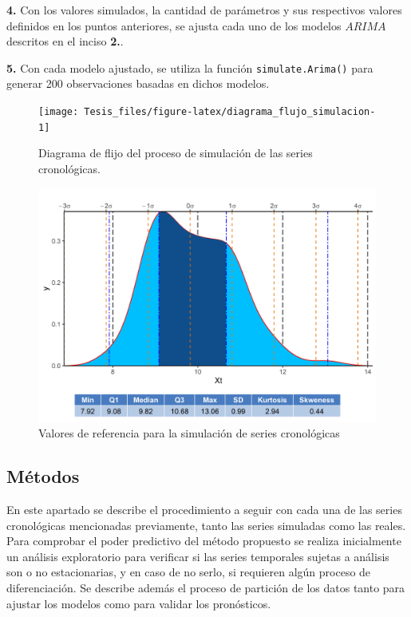 \documentclass[
]{article}
\begin{document}
\textbf{4.} Con los valores simulados, la cantidad de parámetros y sus
respectivos valores definidos en los puntos anteriores, se ajusta cada
uno de los modelos \(ARIMA\) descritos en el inciso \textbf{2.}.

\textbf{5.} Con cada modelo ajustado, se utiliza la función
\texttt{simulate.Arima()} para generar 200 observaciones basadas en
dichos modelos.

\begin{figure}[H]
\texttt{[image: Tesis\_files/figure-latex/diagrama\_flujo\_simulacion-1]} \caption{Diagrama de flijo del proceso de simulación de las series cronológicas.}\label{fig:diagrama_flujo_simulacion}
\end{figure}

\begin{figure}[H]
\includegraphics[width=1\linewidth,height=1\textheight]{Tesis_files/figure-latex/datos_simulados-1} \caption{Valores de referencia para la simulación de series cronológicas}\label{fig:datos_simulados}
\end{figure}

\subsection{Métodos}

En este apartado se describe el procedimiento a seguir con cada una de
las series cronológicas mencionadas previamente, tanto las series
simuladas como las reales. Para comprobar el poder predictivo del método
propuesto se realiza inicialmente un análisis exploratorio para
verificar si las series temporales sujetas a análisis son o no
estacionarias, y en caso de no serlo, si requieren algún proceso de
diferenciación. Se describe además el proceso de partición de los datos
tanto para ajustar los modelos como para validar los pronósticos.
\end{document}
